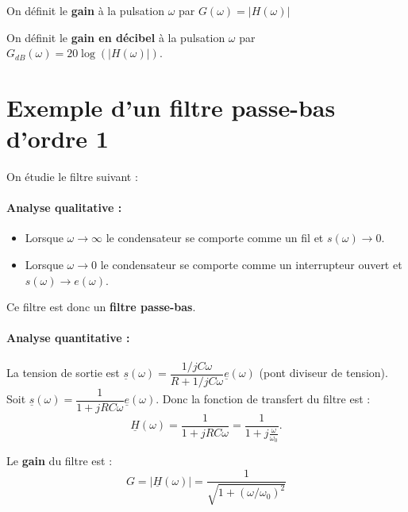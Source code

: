 \documentclass{cours}
\begin{document}
On définit le \textbf{gain} à la pulsation $\omega$ par $G(\omega)=|H(\omega)|$

On définit le \textbf{gain en décibel} à la pulsation $\omega$ par $G_{dB}(\omega)=20\log(|H(\omega)|)$.

\section{Exemple d'un filtre passe-bas d'ordre 1}
On étudie le filtre suivant :
\begin{center}
\end{center}

\paragraph{Analyse qualitative :}
\begin{itemize}
\item Lorsque $\omega\rightarrow\infty$ le condensateur se comporte comme un fil et $s(\omega)\rightarrow 0$.
\item Lorsque $\omega\rightarrow 0 $ le condensateur se comporte comme un interrupteur ouvert et $s(\omega)\rightarrow e(\omega)$.
\end{itemize}
Ce filtre est donc un \textbf{filtre passe-bas}.

\paragraph{Analyse quantitative :}
La tension de sortie est $\underline{s}(\omega)=\dfrac{1/jC\omega}{R+1/jC\omega}\underline{e}(\omega)$ (pont diviseur de tension). Soit $\underline{s}(\omega)=\dfrac{1}{1+jRC\omega}\underline{e}(\omega)$. Donc la fonction de transfert du filtre est :
\begin{equation*}
\underline{H}(\omega)=\frac{1}{1+jRC\omega} = \frac{1}{1+j \frac{\omega}{\omega_0}}.
\end{equation*}

Le \textbf{gain} du filtre est :
\begin{equation*}
G=|\underline{H}(\omega)| = \frac{1}{\sqrt{1+(\omega/\omega_0)^2}}
\end{equation*}
\end{document}
